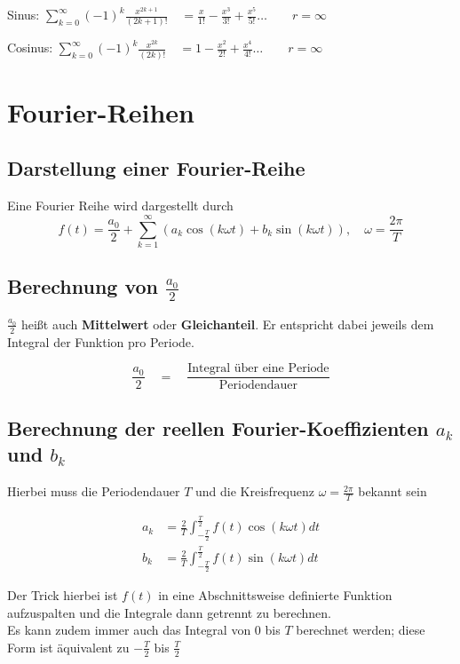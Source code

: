 \documentclass[12pt, a4paper]{scrreprt}
\begin{document}
Sinus: \hfill
\(
\sum_{k=0}^{\infty}(-1)^k\frac{x^{2k+1}}{(2k+1)!} \quad = \frac{x}{1!} - \frac{x^3}{3!} + \frac{x^5}{5!} \dots \qquad r = \infty
\)

Cosinus: \hfill
\(
\sum_{k=0}^{\infty}(-1)^k\frac{x^{2k}}{(2k)!} \quad = 1 - \frac{x^2}{2!} + \frac{x^4}{4!} \dots \qquad r = \infty
\)


\clearpage

\setcounter{chapter}{15}

\chapter{Fourier-Reihen}

\section{Darstellung einer Fourier-Reihe}
Eine Fourier Reihe wird dargestellt durch
\[
  f(t) = \frac{a_0}{2} + \sum_{k=1}^{\infty}(a_k \cos (k \omega t) + b_k \sin (k \omega t)), \quad \omega = \frac{2 \pi}{T}
\]

\section{Berechnung von \(\frac{a_0}{2}\)}

\(\frac{a_0}{2}\) heißt auch \textbf{Mittelwert} oder \textbf{Gleichanteil}. Er entspricht dabei jeweils dem Integral der Funktion pro Periode.

\[
  \frac{a_0}{2} \quad = \quad \frac{\text{Integral über eine Periode}}{\text{Periodendauer}}
\]

\section{Berechnung der reellen Fourier-Koeffizienten \(a_k\) und \(b_k\)}

Hierbei muss die Periodendauer \(T\) und die Kreisfrequenz \(\omega = \frac{2\pi}{T}\) bekannt sein

\begin{align*}
  a_k &= \frac{2}{T} \int_{-\frac{T}{2}}^{\frac{T}{2}}f(t) \cos (k \omega t) dt\\[10pt]
  b_k &= \frac{2}{T} \int_{-\frac{T}{2}}^{\frac{T}{2}}f(t) \sin (k \omega t) dt
\end{align*}

Der Trick hierbei ist \(f(t)\) in eine Abschnittsweise definierte Funktion aufzuspalten und die Integrale dann getrennt zu berechnen.\\
Es kann zudem immer auch das Integral von \(0\) bis \(T\) berechnet werden; diese Form ist äquivalent zu \(-\frac{T}{2}\) bis \(\frac{T}{2}\)
\end{document}
